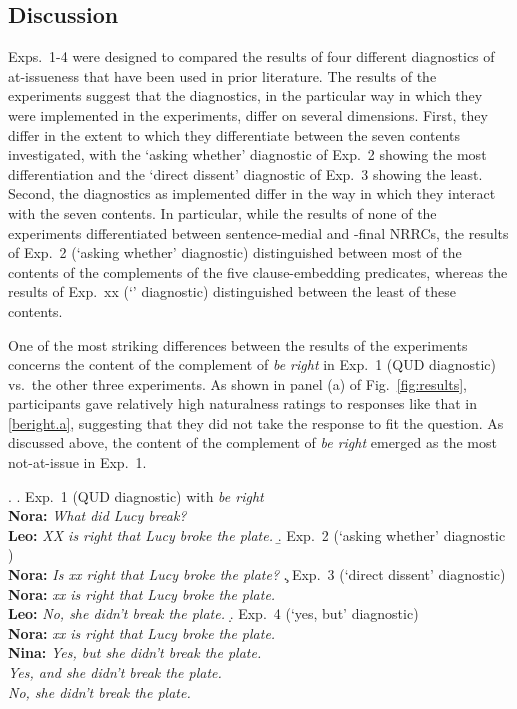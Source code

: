 \documentclass[times,linguex,xcolor]{glossa}
\begin{document}
\newpage

\subsection{Discussion}

Exps.~1-4 were designed to compared the results of four different diagnostics of at-issueness that have been used in prior literature. The results of the experiments suggest that the diagnostics, in the particular way in which they were implemented in the experiments, differ on several dimensions. First, they differ in the extent to which they differentiate between the seven contents investigated, with the `asking whether' diagnostic of Exp.~2 showing the most differentiation and the `direct dissent' diagnostic of Exp.~3 showing the least. Second, the diagnostics as implemented differ in the way in which they interact with the seven contents. In particular, while the results of none of the experiments differentiated between sentence-medial and -final NRRCs, the results of Exp.~2 (`asking whether' diagnostic) distinguished between most of the contents of the complements of the five clause-embedding predicates, whereas the results of Exp.~xx (`' diagnostic) distinguished between the least of these contents.

One of the most striking differences between the results of the experiments concerns the content of the complement of \emph{be right} in Exp.~1 (QUD diagnostic) vs.\ the other three experiments. As shown in panel (a) of Fig.~\ref{fig:results}, participants gave relatively high naturalness ratings to responses like that in \ref{beright.a}, suggesting that they did not take the response to fit the question. As discussed above, the content of the complement of \emph{be right} emerged as the most not-at-issue in Exp.~1. 

\ex.
\a.\label{beright.a}  Exp.~1 (QUD diagnostic) with \emph{be right}
\\ {\bf Nora:} \emph{What did Lucy break?}
\\ {\bf Leo:} \emph{XX is right that Lucy broke the plate.}
\b.\label{beright.b} Exp.~2 (`asking whether' diagnostic )
\\ {\bf Nora:} \emph{Is xx right that Lucy broke the plate?}
\c.\label{beright.c} Exp.~3 (`direct dissent' diagnostic)
\\ {\bf Nora:} \emph{xx is right that Lucy broke the plate.}
\\ {\bf Leo:} \emph{No, she didn't break the plate.}
\d.\label{beright.d} Exp.~4 (`yes, but' diagnostic)
\\ {\bf Nora:} \emph{xx is right that Lucy broke the plate.}
\\ {\bf Nina:} \emph{Yes, but she didn't break the plate.}
\\ \hspace*{1cm} \emph{Yes, and she didn't break the plate.}
\\ \hspace*{1cm} \emph{No, she didn't break the plate.}
\end{document}
